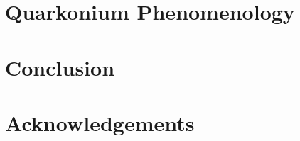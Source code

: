 \documentclass[11pt, a4paper, twoside]{book}
\begin{document}
\chapter{Quarkonium Phenomenology}
\label{sec:quark_pheno}
\onehalfspacing
\chapter{Conclusion}
\label{sec:conc}
\onehalfspacing




\chapter*{Acknowledgements}


\cleardoublepage

\end{document}
